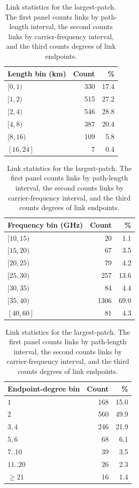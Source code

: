 \documentclass[a4paper,fleqn]{cas-sc}
\begin{document}
\begin{table}[!htbp]
  \centering
  \begin{minipage}[t]{0.31\textwidth}
    \centering
    \scriptsize
    \begin{tabular}{lrr}
      \toprule
      Length bin (km) & Count & \%   \\
      \midrule
      $[0,1)$         & 330   & 17.4 \\
      $[1,2)$         & 515   & 27.2 \\
      $[2,4)$         & 546   & 28.8 \\
      $[4,8)$         & 387   & 20.4 \\
      $[8,16)$        & 109   & 5.8  \\
      $[16,24]$       & 7     & 0.4  \\
      \bottomrule
    \end{tabular}
  \end{minipage}
  \hfill
  \begin{minipage}[t]{0.31\textwidth}
    \centering
    \scriptsize
    \begin{tabular}{lrr}
      \toprule
      Frequency bin (GHz) & Count & \%   \\
      \midrule
      $[10,15)$           & 20    & 1.1  \\
      $[15,20)$           & 67    & 3.5  \\
      $[20,25)$           & 79    & 4.2  \\
      $[25,30)$           & 257   & 13.6 \\
      $[30,35)$           & 84    & 4.4  \\
      $[35,40)$           & 1306  & 69.0 \\
      $[40,60]$           & 81    & 4.3  \\
      \bottomrule
    \end{tabular}
  \end{minipage}
  \hfill
  \begin{minipage}[t]{0.31\textwidth}
    \centering
    \scriptsize
    \begin{tabular}{lrr}
      \toprule
      Endpoint-degree bin & Count & \%   \\
      \midrule
      $1$                 & 168   & 15.0 \\
      $2$                 & 560   & 49.9 \\
      $3,4$               & 246   & 21.9 \\
      $5,6$               & 68    & 6.1  \\
      $7..10$             & 39    & 3.5  \\
      $11..20$            & 26    & 2.3  \\
      $\geq 21$           & 16    & 1.4  \\
      \bottomrule
    \end{tabular}
  \end{minipage}
  \caption{Link statistics for the largest-patch. The first panel counts links by path-length interval, the second counts links by carrier-frequency interval, and the third counts degrees of link endpoints.}
  \label{tab:largest_patch_distributions}
\end{table}
\end{document}
